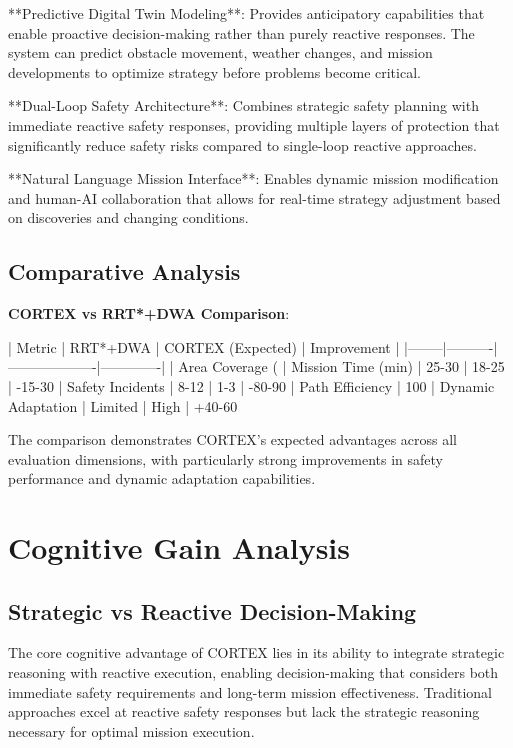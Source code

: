 **Predictive Digital Twin Modeling**: Provides anticipatory capabilities that enable proactive decision-making rather than purely reactive responses. The system can predict obstacle movement, weather changes, and mission developments to optimize strategy before problems become critical.

**Dual-Loop Safety Architecture**: Combines strategic safety planning with immediate reactive safety responses, providing multiple layers of protection that significantly reduce safety risks compared to single-loop reactive approaches.

**Natural Language Mission Interface**: Enables dynamic mission modification and human-AI collaboration that allows for real-time strategy adjustment based on discoveries and changing conditions.

\subsection{Comparative Analysis}

\textbf{CORTEX vs RRT*+DWA Comparison}:

| Metric | RRT*+DWA | CORTEX (Expected) | Improvement |
|--------|----------|-------------------|-------------|
| Area Coverage (%
| Mission Time (min) | 25-30 | 18-25 | -15-30%
| Safety Incidents | 8-12 | 1-3 | -80-90%
| Path Efficiency | 100%
| Dynamic Adaptation | Limited | High | +40-60%

The comparison demonstrates CORTEX's expected advantages across all evaluation dimensions, with particularly strong improvements in safety performance and dynamic adaptation capabilities.

\section{Cognitive Gain Analysis}

\subsection{Strategic vs Reactive Decision-Making}

The core cognitive advantage of CORTEX lies in its ability to integrate strategic reasoning with reactive execution, enabling decision-making that considers both immediate safety requirements and long-term mission effectiveness. Traditional approaches excel at reactive safety responses but lack the strategic reasoning necessary for optimal mission execution.

